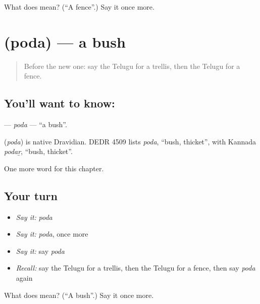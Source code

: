 \begin{tcolorbox}[breakable,colback=teal!4,colframe=teal!35!black,title={Before you move on}]
What does  mean? (\textquotedblleft{}A fence\textquotedblright{}.) Say it once more.
\end{tcolorbox}
\section[\texorpdfstring{\te{పొద} (poda)}{పొద (poda)}]{ (poda) — a bush}

\label{lesson:TE-C272-poda}



\begin{quote}
Before the new one: say the Telugu for a trellis, then the Telugu for a fence.
\end{quote}

\subsection*{You'll want to know: }
\textbf{} — \emph{poda} — \textquotedblleft{}a bush\textquotedblright{}.

\begin{cousinweb}
\textbf{} (\emph{poda}) is native Dravidian. DEDR 4509 lists \emph{poda}, \textquotedblleft{}bush, thicket\textquotedblright{}, with Kannada \emph{podaṟ}, \textquotedblleft{}bush, thicket\textquotedblright{}.
\end{cousinweb}

\begin{grammarlens}[title={What you've built}]
One more word for this chapter.
\end{grammarlens}

\subsection*{Your turn}
\begin{itemize}
\raggedright
  \item \emph{Say it:} \emph{poda}
  \item \emph{Say it:} \emph{poda}, once more
  \item \emph{Say it:} say \emph{poda}
  \item \emph{Recall:} say the Telugu for a trellis, then the Telugu for a fence, then say \emph{poda} again
\end{itemize}

\begin{tcolorbox}[breakable,colback=teal!4,colframe=teal!35!black,title={Before you move on}]
What does  mean? (\textquotedblleft{}A bush\textquotedblright{}.) Say it once more.
\end{tcolorbox}
